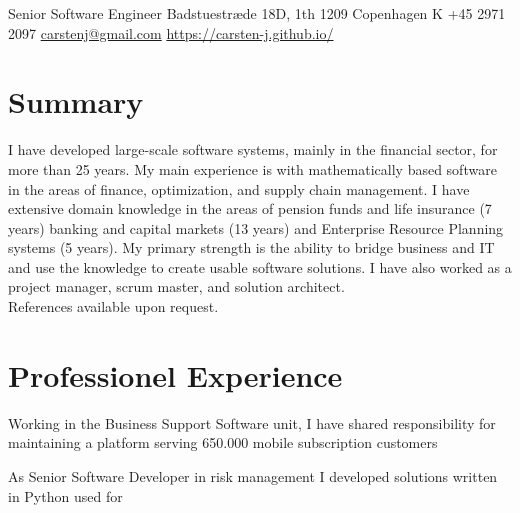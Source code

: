 \documentclass[10pt, a4paper]{article}
\begin{document}
{Senior Software Engineer}
{Badstuestræde 18D, 1th}
{1209 Copenhagen K}
{+45 2971 2097}
{\href{mailto:carstenj@gmail.com}{carstenj@gmail.com}}
{\href{https://carsten-j.github.io/}{https://carsten-j.github.io/}}

\section{Summary}
I have developed large-scale software systems, mainly in the financial sector, for more than 25 years. My main experience is with mathematically based software in the areas of finance, optimization, and supply chain management. I have extensive domain knowledge in the areas of pension funds and life insurance (7 years) banking and capital markets (13 years) and Enterprise Resource Planning systems (5 years). My primary strength is the ability to bridge business and IT and use the knowledge to create usable software solutions. I have also worked as a project manager, scrum master, and solution architect.
\\[0.2cm]
References available upon request.

\section{Professionel Experience}


{Working in the Business Support Software unit, I have shared responsibility for maintaining a platform serving 650.000 mobile subscription customers}
{
}

{As Senior Software Developer in risk management I developed solutions written in Python used for}
{
}
\end{document}
